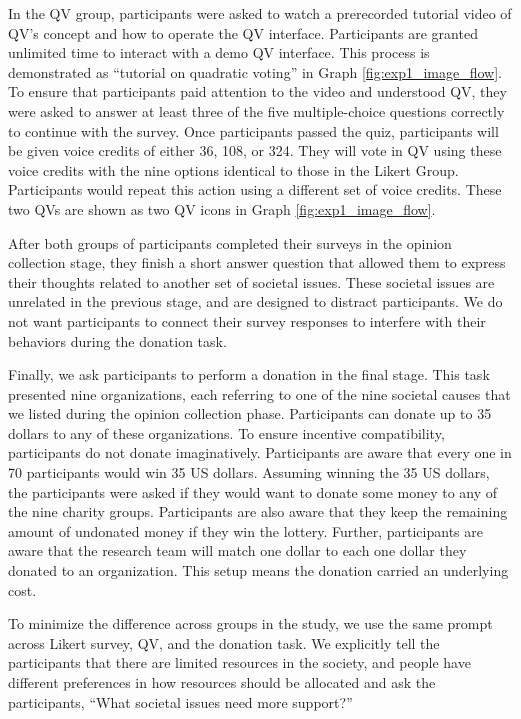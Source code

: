 In the QV group, 
participants were asked to watch 
a prerecorded tutorial video of QV's concept 
and how to operate the QV interface.
Participants are granted unlimited time 
to interact with a demo QV interface. 
This process is demonstrated as 
``tutorial on quadratic voting'' 
in Graph \ref{fig:exp1_image_flow}.
To ensure that participants paid attention to the video and understood QV, 
they were asked to answer at least three of the five multiple-choice questions 
correctly to continue with the survey.
Once participants passed the quiz, 
participants will be given voice credits of either 36, 108, or 324.
They will vote in QV using these voice credits 
with the nine options identical to those in the Likert Group.
Participants would repeat this action using a different set of voice credits.
These two QVs are shown as two QV icons in Graph \ref{fig:exp1_image_flow}.



After both groups of participants completed their surveys in the opinion collection stage, 
they finish a short answer question
that allowed them to express their thoughts 
related to another set of societal issues.
These societal issues are unrelated in the previous stage,
and are designed to distract participants.
We do not want participants to connect their survey responses
to interfere with their behaviors during the donation task.

Finally, 
we ask participants to perform a donation in the final stage.
This task presented nine organizations,
each referring to one of the nine societal causes
that we listed during the opinion collection phase.
Participants can donate up to 35 dollars 
to any of these organizations.
To ensure incentive compatibility, 
participants do not donate imaginatively.
Participants are aware that every one in 70 participants would win 35 US dollars.
Assuming winning the 35 US dollars, 
the participants were asked 
if they would want to donate some money 
to any of the nine charity groups.
Participants are also aware that 
they keep the remaining amount of undonated money 
if they win the lottery.
Further, participants are aware that 
the research team will match one dollar to each one dollar 
they donated to an organization.
This setup means the donation carried an underlying cost.

To minimize the difference across groups in the study, 
we use the same prompt across Likert survey, QV, and the donation task.
We explicitly tell the participants that 
there are limited resources in the society, 
and people have different preferences 
in how resources should be allocated and ask the participants, 
``What societal issues need more support?''

